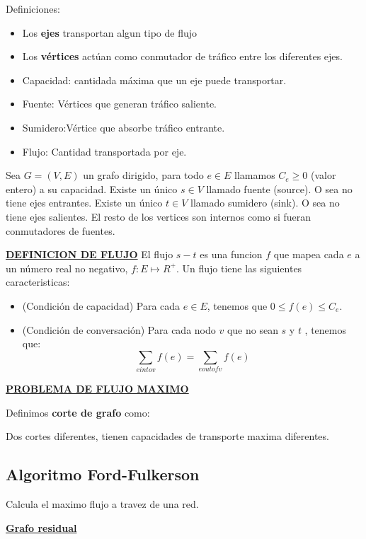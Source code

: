 \documentclass{article}
\begin{document}
Definiciones:
\begin{itemize}
    \item Los \textbf{ejes} transportan algun tipo de flujo
    \item Los \textbf{vértices} actúan como conmutador de tráfico entre los diferentes ejes.
    \item Capacidad: cantidada máxima que un eje puede transportar.
    \item Fuente: Vértices que generan tráfico saliente.
    \item Sumidero:Vértice que absorbe tráfico entrante.
    \item Flujo: Cantidad transportada por eje.
\end{itemize}

Sea \(G=(V,E)\) un grafo dirigido, para todo \(e \in E\) llamamos \(C_e \geq 0\) (valor entero) a su capacidad.
Existe un único \(s \in V\) llamado fuente (source). O sea no tiene ejes entrantes.
Existe un único \(t \in V\) llamado sumidero (sink). O sea no tiene ejes salientes.
El resto de los vertices son internos como si fueran conmutadores de fuentes.

\noindent
\textbf{\underline{DEFINICION DE FLUJO}}
El flujo \(s-t\) es una funcion \(f\) que mapea cada \(e\) a un número real no negativo,
\(f: E \mapsto R^+\). Un flujo tiene las siguientes caracteristicas:

\begin{itemize}
    \item (Condición de capacidad) Para cada \(e \in E\), tenemos que \(0 \leq f(e) \leq C_e\).
    \item (Condición de conversación) Para cada nodo \(v\) que no sean \(s\) y \(t\) , tenemos que:
    \[
        \sum_{e into v} f(e)  = \sum_{e out of v} f(e) 
    \]
\end{itemize}

\noindent
\textbf{\underline{PROBLEMA DE FLUJO MAXIMO}}

Definimos \textbf{corte de grafo} como: 

Dos cortes diferentes, tienen capacidades de transporte maxima diferentes.


\newpage
\subsection{Algoritmo Ford-Fulkerson}

Calcula el maximo flujo a travez de una red.

\noindent
\underline{\textbf{Grafo residual}}
\end{document}
